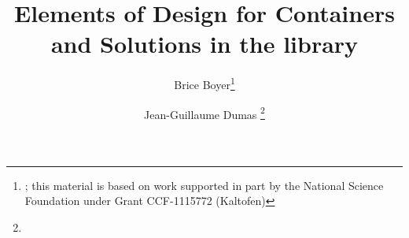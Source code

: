 \documentclass{article}
\title{Elements of Design for Containers and Solutions in the \linbox library}
\author{Brice Boyer\footnote{\mailto{bbboyer@ncsu.edu}; this material is based on work supported in part by the National Science Foundation
under Grant CCF-1115772 (Kaltofen)}
\and Jean-Guillaume Dumas
\footnote{\mailto{Jean-Guillaume.Dumas@imag.fr}}
}
\date{}
\newif\ifAbstractOnly
\begin{document}
\maketitle



\ifAbstractOnly
\else



%

%
%
%

%
%
%
%


%

%
%
%
%

%
%
%
%
\fi %



%
%
\end{document}
